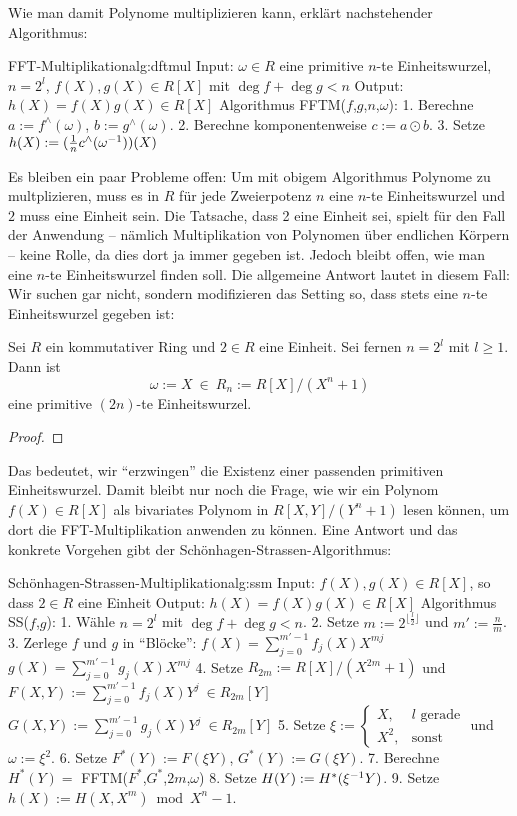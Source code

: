 Wie man damit Polynome multiplizieren kann, erklärt nachstehender Algorithmus:
\begin{pseudocode}{FFT-Multiplikation}{alg:dftmul}
Input: $\omega \in R$ eine primitive $n$-te Einheitswurzel, $n = 2^l$,
       $f(X),g(X) \in R[X]$ mit $\deg f + \deg g < n$
Output: $h(X) = f(X)g(X) \in R[X]$
Algorithmus FFTM($f$,$g$,$n$,$\omega$):
  1. Berechne $a := f^\wedge(\omega)$, $b := g^\wedge(\omega)$.
  2. Berechne komponentenweise $c := a\odot b$.
  3. Setze $h(X) := (\tfrac 1 n c^\wedge(\omega^{-1}))(X)$
\end{pseudocode}


Es bleiben ein paar Probleme offen: Um mit obigem Algorithmus Polynome zu
multplizieren, muss es in $R$ für jede Zweierpotenz $n$ eine $n$-te
Einheitswurzel und $2$ muss eine Einheit sein. Die Tatsache, dass 2 eine
Einheit sei, spielt für den Fall der Anwendung -- nämlich Multiplikation von
Polynomen über endlichen Körpern -- keine Rolle, da dies dort ja immer gegeben
ist. Jedoch bleibt offen, wie man eine $n$-te Einheitswurzel finden soll.
Die allgemeine Antwort lautet in diesem Fall: Wir suchen gar nicht, sondern
modifizieren das Setting so, dass stets eine $n$-te Einheitswurzel gegeben
ist:

\begin{lemma}
  Sei $R$ ein kommutativer Ring und $2 \in R$ eine Einheit. Sei fernen 
  $n = 2^l$ mit $l\geq 1$. Dann ist 
  \[ \omega := X\  \in\ R_n := R[X]\big/(X^n+1)\]
  eine primitive $(2n)$-te Einheitswurzel.
\end{lemma}
\begin{proof}
  
\end{proof}

Das bedeutet, wir "`erzwingen"' die Existenz einer passenden primitiven
Einheitswurzel. Damit bleibt nur noch die Frage, wie wir ein Polynom 
$f(X) \in R[X]$ als bivariates Polynom in $R[X,Y]\big/(Y^n+1)$ lesen können, um
dort die FFT-Multiplikation anwenden zu können. Eine Antwort und das konkrete
Vorgehen gibt der Schönhagen-Strassen-Algorithmus:

\begin{pseudocode}{Schönhagen-Strassen-Multiplikation}{alg:ssm}
Input: $f(X),g(X) \in R[X]$, so dass $2 \in R$ eine Einheit
Output: $h(X) = f(X)g(X) \in R[X]$
Algorithmus SS($f$,$g$):
  1. Wähle $n = 2^l$ mit $\deg f + \deg g < n$.
  2. Setze $m := 2^{\lfloor\tfrac l 2\rfloor}$ und $m' := \tfrac n m$.
  3. Zerlege $f$ und $g$ in "`Blöcke"':
     $f(X) = \sum_{j=0}^{m'-1} f_j(X) X^{mj}$
     $g(X) = \sum_{j=0}^{m'-1} g_j(X) X^{mj}$
  4. Setze $R_{2m} := R[X]\big/(X^{2m}+1)$ und 
     $F(X,Y) := \sum_{j=0}^{m'-1} f_j(X) Y^j\ \in R_{2m}[Y]$
     $G(X,Y) := \sum_{j=0}^{m'-1} g_j(X) Y^j\ \in R_{2m}[Y]$
  5. Setze $\xi := \begin{cases} X, & l \text{ gerade}\\ X^2, &
      \text{sonst}\end{cases}$ und $\omega := \xi^2$.
  6. Setze $F^\ast(Y) := F(\xi Y)$, $G^\ast(Y) := G(\xi Y)$.
  7. Berechne $H^\ast(Y) = $ FFTM($F^\ast$,$G^\ast$,$2m$,$\omega$)
  8. Setze $H(Y) := H^\ast(\xi^{-1} Y)$.
  9. Setze $h(X) := H(X,X^m) \bmod{X^n-1}$.
\end{pseudocode}

